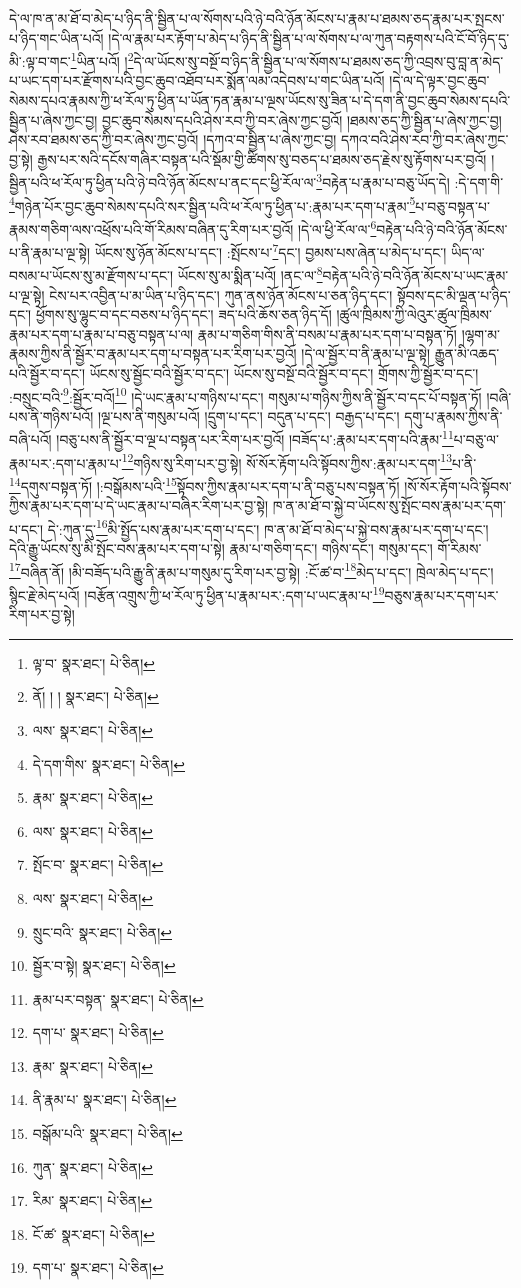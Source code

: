 དེ་ལ་ཁ་ན་མ་ཐོ་བ་མེད་པ་ཉིད་ནི་སྦྱིན་པ་ལ་སོགས་པའི་ཉེ་བའི་ཉོན་མོངས་པ་རྣམ་པ་ཐམས་ཅད་རྣམ་པར་སྤངས་པ་ཉིད་གང་ཡིན་པའོ། །དེ་ལ་རྣམ་པར་རྟོག་པ་མེད་པ་ཉིད་ནི་སྦྱིན་པ་ལ་སོགས་པ་ལ་ཀུན་བརྟགས་པའི་ངོ་བོ་ཉིད་དུ་མི་:ལྟ་བ་གང་\footnote{ལྟ་བ་  སྣར་ཐང་།  པེ་ཅིན། }ཡིན་པའོ། །\footnote{ནོ། ། །  སྣར་ཐང་།  པེ་ཅིན། }དེ་ལ་ཡོངས་སུ་བསྔོ་བ་ཉིད་ནི་སྦྱིན་པ་ལ་སོགས་པ་ཐམས་ཅད་ཀྱི་འབྲས་བུ་བླ་ན་མེད་པ་ཡང་དག་པར་རྫོགས་པའི་བྱང་ཆུབ་འཐོབ་པར་སྨོན་ལམ་འདེབས་པ་གང་ཡིན་པའོ། །དེ་ལ་དེ་ལྟར་བྱང་ཆུབ་སེམས་དཔའ་རྣམས་ཀྱི་ཕ་རོལ་ཏུ་ཕྱིན་པ་ཡོན་ཏན་རྣམ་པ་ལྔས་ཡོངས་སུ་ཟིན་པ་དེ་དག་ནི་བྱང་ཆུབ་སེམས་དཔའི་སྦྱིན་པ་ཞེས་ཀྱང་བྱ། བྱང་ཆུབ་སེམས་དཔའི་ཤེས་རབ་ཀྱི་བར་ཞེས་ཀྱང་བྱའོ། །ཐམས་ཅད་ཀྱི་སྦྱིན་པ་ཞེས་ཀྱང་བྱ། ཤེས་རབ་ཐམས་ཅད་ཀྱི་བར་ཞེས་ཀྱང་བྱའོ། །དཀའ་བ་སྦྱིན་པ་ཞེས་ཀྱང་བྱ། དཀའ་བའི་ཤེས་རབ་ཀྱི་བར་ཞེས་ཀྱང་བྱ་སྟེ། རྒྱས་པར་སའི་དངོས་གཞིར་བསྟན་པའི་སྡོམ་གྱི་ཚིགས་སུ་བཅད་པ་ཐམས་ཅད་རྗེས་སུ་རྟོགས་པར་བྱའོ། །སྦྱིན་པའི་ཕ་རོལ་ཏུ་ཕྱིན་པའི་ཉེ་བའི་ཉོན་མོངས་པ་ནང་དང་ཕྱི་རོལ་ལ་\footnote{ལས་  སྣར་ཐང་།  པེ་ཅིན། }བརྟེན་པ་རྣམ་པ་བཅུ་ཡོད་དེ། :དེ་དག་གི་\footnote{དེ་དག་གིས་  སྣར་ཐང་།  པེ་ཅིན། }གཉེན་པོར་བྱང་ཆུབ་སེམས་དཔའི་སར་སྦྱིན་པའི་ཕ་རོལ་ཏུ་ཕྱིན་པ་:རྣམ་པར་དག་པ་རྣམ་\footnote{རྣམ་  སྣར་ཐང་།  པེ་ཅིན། }པ་བཅུ་བསྟན་པ་རྣམས་གཅིག་ལས་འཕྲོས་པའི་གོ་རིམས་བཞིན་དུ་རིག་པར་བྱའོ། །དེ་ལ་ཕྱི་རོལ་ལ་\footnote{ལས་  སྣར་ཐང་།  པེ་ཅིན། }བརྟེན་པའི་ཉེ་བའི་ཉོན་མོངས་པ་ནི་རྣམ་པ་ལྔ་སྟེ། ཡོངས་སུ་ཉོན་མོངས་པ་དང་། :སྤོངས་པ་\footnote{སྤོང་བ་  སྣར་ཐང་།  པེ་ཅིན། }དང་། བྱམས་པས་ཞེན་པ་མེད་པ་དང་། ཡིད་ལ་བསམ་པ་ཡོངས་སུ་མ་རྫོགས་པ་དང་། ཡོངས་སུ་མ་སྨིན་པའོ། །ནང་ལ་\footnote{ལས་  སྣར་ཐང་།  པེ་ཅིན། }བརྟེན་པའི་ཉེ་བའི་ཉོན་མོངས་པ་ཡང་རྣམ་པ་ལྔ་སྟེ། ངེས་པར་འབྱིན་པ་མ་ཡིན་པ་ཉིད་དང་། ཀུན་ནས་ཉོན་མོངས་པ་ཅན་ཉིད་དང་། སྟོབས་དང་མི་ལྡན་པ་ཉིད་དང་། ཕྱོགས་སུ་ལྷུང་བ་དང་བཅས་པ་ཉིད་དང་། ཟད་པའི་ཆོས་ཅན་ཉིད་དོ། །ཚུལ་ཁྲིམས་ཀྱི་ལེའུར་ཚུལ་ཁྲིམས་རྣམ་པར་དག་པ་རྣམ་པ་བཅུ་བསྟན་པ་ལ། རྣམ་པ་གཅིག་གིས་ནི་བསམ་པ་རྣམ་པར་དག་པ་བསྟན་ཏོ། །ལྷག་མ་རྣམས་ཀྱིས་ནི་སྦྱོར་བ་རྣམ་པར་དག་པ་བསྟན་པར་རིག་པར་བྱའོ། །དེ་ལ་སྦྱོར་བ་ནི་རྣམ་པ་ལྔ་སྟེ། རྒྱུན་མི་འཆད་པའི་སྦྱོར་བ་དང་། ཡོངས་སུ་སྦྱོང་བའི་སྦྱོར་བ་དང་། ཡོངས་སུ་བསྔོ་བའི་སྦྱོར་བ་དང་། གྲོགས་ཀྱི་སྦྱོར་བ་དང་། :བསྲུང་བའི་\footnote{སྲུང་བའི་  སྣར་ཐང་།  པེ་ཅིན། }:སྦྱོར་བའོ།\footnote{སྦྱོར་བ་སྟེ།  སྣར་ཐང་།  པེ་ཅིན། } །དེ་ཡང་རྣམ་པ་གཉིས་པ་དང་། གསུམ་པ་གཉིས་ཀྱིས་ནི་སྦྱོར་བ་དང་པོ་བསྟན་ཏོ། །བཞི་པས་ནི་གཉིས་པའོ། །ལྔ་པས་ནི་གསུམ་པའོ། །དྲུག་པ་དང་། བདུན་པ་དང་། བརྒྱད་པ་དང་། དགུ་པ་རྣམས་ཀྱིས་ནི་བཞི་པའོ། །བཅུ་པས་ནི་སྦྱོར་བ་ལྔ་པ་བསྟན་པར་རིག་པར་བྱའོ། །བཟོད་པ་:རྣམ་པར་དག་པའི་རྣམ་\footnote{རྣམ་པར་བསྟན་  སྣར་ཐང་།  པེ་ཅིན། }པ་བཅུ་ལ་རྣམ་པར་:དག་པ་རྣམ་པ་\footnote{དག་པ་  སྣར་ཐང་།  པེ་ཅིན། }གཉིས་སུ་རིག་པར་བྱ་སྟེ། སོ་སོར་རྟོག་པའི་སྟོབས་ཀྱིས་:རྣམ་པར་དག་\footnote{རྣམ་  སྣར་ཐང་།  པེ་ཅིན། }པ་ནི་\footnote{ནི་རྣམ་པ་  སྣར་ཐང་།  པེ་ཅིན། }དགུས་བསྟན་ཏོ། །:བསྒོམས་པའི་\footnote{བསྒོམ་པའི་  སྣར་ཐང་།  པེ་ཅིན། }སྟོབས་ཀྱིས་རྣམ་པར་དག་པ་ནི་བཅུ་པས་བསྟན་ཏོ། །སོ་སོར་རྟོག་པའི་སྟོབས་ཀྱིས་རྣམ་པར་དག་པ་དེ་ཡང་རྣམ་པ་བཞིར་རིག་པར་བྱ་སྟེ། ཁ་ན་མ་ཐོ་བ་སྐྱེ་བ་ཡོངས་སུ་སྤོང་བས་རྣམ་པར་དག་པ་དང་། དེ་:ཀུན་དུ་\footnote{ཀུན་  སྣར་ཐང་།  པེ་ཅིན། }མི་སྤྱོད་པས་རྣམ་པར་དག་པ་དང་། ཁ་ན་མ་ཐོ་བ་མེད་པ་སྐྱེ་བས་རྣམ་པར་དག་པ་དང་། དེའི་རྒྱུ་ཡོངས་སུ་མི་སྤོང་བས་རྣམ་པར་དག་པ་སྟེ། རྣམ་པ་གཅིག་དང་། གཉིས་དང་། གསུམ་དང་། གོ་རིམས་\footnote{རིམ་  སྣར་ཐང་།  པེ་ཅིན། }བཞིན་ནོ། །མི་བཟོད་པའི་རྒྱུ་ནི་རྣམ་པ་གསུམ་དུ་རིག་པར་བྱ་སྟེ། :ངོ་ཚ་བ་\footnote{ངོ་ཚ་  སྣར་ཐང་།  པེ་ཅིན། }མེད་པ་དང་། ཁྲེལ་མེད་པ་དང་། སྙིང་རྗེ་མེད་པའོ། །བརྩོན་འགྲུས་ཀྱི་ཕ་རོལ་ཏུ་ཕྱིན་པ་རྣམ་པར་:དག་པ་ཡང་རྣམ་པ་\footnote{དག་པ་  སྣར་ཐང་།  པེ་ཅིན། }བཅུས་རྣམ་པར་དག་པར་རིག་པར་བྱ་སྟེ། 